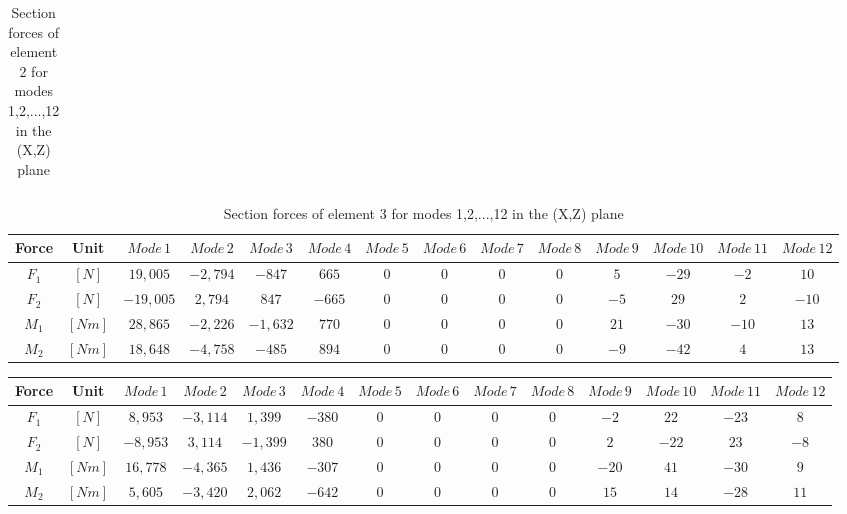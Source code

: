 \documentclass[11pt,a4paper,titlepage]{report}
\begin{document}
\begin{appendix}
\begin{landscape}
\begin{table}[]
\begin{tiny}
\begin{tabular}{c|c|c|c|c|c|c|c|c|c|c|c|c|c}
        \end{tabular}
        \end{tiny}
    \caption{Section forces of element 2 for modes 1,2,...,12 in the (X,Z) plane}
    \label{tab:my_label}
\end{table}
\begin{table}[]
    \centering
    \begin{tiny}
    \begin{tabular}{c|c|c|c|c|c|c|c|c|c|c|c|c|c}
    Force & Unit & $Mode\,1$ & $Mode\,2$ & $Mode\,3$ & $Mode\,4$ & $Mode\,5$ & $Mode\,6$ & $Mode\,7$ & $Mode\,8$ & $Mode\,9$ & $Mode\,10$ & $Mode\,11$ & $Mode\,12$\\
    \hline
   $F_1$ & $[N]$ & $19,005$ & $-2,794$ & $-847$ & $665$ & $0$ & $0$ & $0$ & $0$ & $5$ & $-29$ & $-2$ &  $10$\\
   $F_2$ & $[N]$ & $-19,005$ & $2,794$ & $847$ & $-665$ & $0$ & $0$ & $0$ & $0$ & $-5$ & $29$ & $2$ &  $-10$\\
    $M_1$ & $[Nm]$ & $28,865$ & $-2,226$ & $-1,632$ & $770$ & $0$ & $0$ & $0$ & $0$ & $21$ & $-30$ & $-10$ &  $13$\\
    $M_2$ & $[Nm]$ & $18,648$ &  $-4,758$ &  $-485$ &  $894$ & $0$ & $0$ & $0$ & $0$ & $-9$ & $-42$ & $4$ & $13$\\
        \end{tabular}
        \end{tiny}
    \caption{Section forces of element 3 for modes 1,2,...,12 in the (X,Z) plane}
    \label{tab:my_label}
\end{table}
\begin{table}[]
    \centering
    \begin{tiny}
    \begin{tabular}{c|c|c|c|c|c|c|c|c|c|c|c|c|c}
    Force & Unit & $Mode\,1$ & $Mode\,2$ & $Mode\,3$ & $Mode\,4$ & $Mode\,5$ & $Mode\,6$ & $Mode\,7$ & $Mode\,8$ & $Mode\,9$ & $Mode\,10$ & $Mode\,11$ & $Mode\,12$\\
    \hline
   $F_1$ & $[N]$ & $8,953$ & $-3,114$ & $1,399$ & $-380$ & $0$ & $0$ & $0$ & $0$ & $-2$ & $22$ & $-23$ &  $8$\\
   $F_2$ & $[N]$ & $-8,953$ & $3,114$ & $-1,399$ & $380$ & $0$ & $0$ & $0$ & $0$ & $2$ & $-22$ & $23$ &  $-8$\\
    $M_1$ & $[Nm]$ & $16,778$ & $-4,365$ & $1,436$ & $-307$ & $0$ & $0$ & $0$ & $0$ & $-20$ & $41$ & $-30$ &  $9$\\
    $M_2$ & $[Nm]$ & $5,605$ &  $-3,420$ &  $2,062$ &  $-642$ & $0$ & $0$ & $0$ & $0$ & $15$ & $14$ & $-28$ & $11$\\

\end{tabular}
\end{tiny}
\end{table}
\end{landscape}
\end{appendix}
\end{document}
